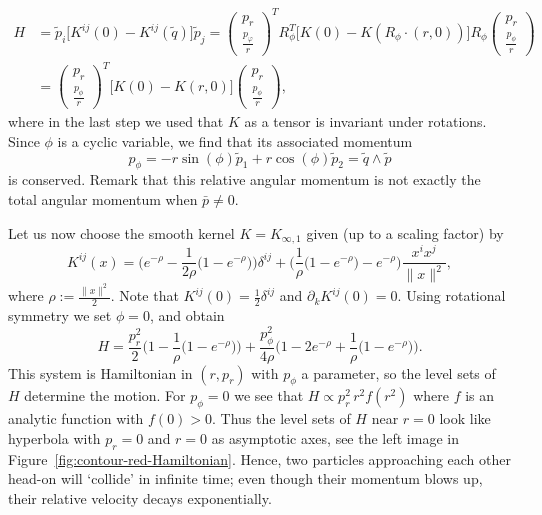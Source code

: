 \documentclass[12pt]{amsart}
\begin{document}
\begin{equation*}
  \begin{aligned}
  H &= \tilde{p}_i \big[ K^{ij}(0) - K^{ij}(\tilde{q}) \big] \tilde{p}_j
     = \begin{pmatrix} p_r \\ \frac{p_\varphi}{r} \end{pmatrix}^T R_\phi^T
       \big[ K(0) - K(R_\phi\cdot(r,0)) \big] R_\phi
       \begin{pmatrix} p_r \\ \frac{p_\phi}{r} \end{pmatrix}\\
    &= \begin{pmatrix} p_r \\ \frac{p_\phi}{r} \end{pmatrix}^T
       \big[ K(0) - K(r,0) \big] \begin{pmatrix} p_r \\ \frac{p_\phi}{r} \end{pmatrix},
  \end{aligned}
\end{equation*}
where in the last step we used that $K$ as a tensor is invariant under
rotations. Since $\phi$ is a cyclic variable, we find that its
associated momentum
\begin{equation*}
  p_\phi = -r \sin(\phi) \tilde{p}_1 + r \cos(\phi) \tilde{p}_2
            = \tilde{q} \wedge \tilde{p}
\end{equation*}
is conserved. Remark that this relative angular momentum is not
exactly the total angular momentum when $\bar{p} \neq 0$.

Let us now choose the smooth kernel $K = K_{\infty,1}$ given
(up to a scaling factor) by
%
{\newcommand{\e}{e^{-\rho}}
\begin{equation}\label{eq:smooth-kernel}
  K^{ij}(x) = \Big(\e - \frac{1}{2\rho}\big(1 - \e\big)\Big)\delta^{ij}
    + \Big(\frac{1}{\rho}\big(1 - \e\big) - \e\Big)\frac{x^i x^j}{\|x\|^2},
\end{equation}%
}%
where $\rho := \frac{\|x\|^2}{2}$. Note that
$K^{ij}(0) = \frac{1}{2} \delta^{ij}$ and $\partial_k K^{ij}(0) = 0$.
Using rotational symmetry we set $\phi = 0$, and obtain
\begin{equation}\label{eq:H-rot-reduced}
  H = \frac{p_r^2      }{2}    \Big(1 - \frac{1}{\rho}\big(1-e^{-\rho}\big)\Big)
     +\frac{p_\phi^2}{4\rho}\Big(1 - 2e^{-\rho} + \frac{1}{\rho}\big(1-e^{-\rho}\big)\Big).
\end{equation}
This system is Hamiltonian in $(r,p_r)$ with $p_\phi$ a parameter, so
the level sets of $H$ determine the motion. For $p_\phi = 0$ we see
that $H \propto p_r^2\, r^2 f(r^2)$ where $f$ is an analytic function
with $f(0) > 0$. Thus the level sets of $H$ near $r = 0$ look like
hyperbola with $p_r = 0$ and $r = 0$ as asymptotic axes, see the left image in
Figure~\eqref{fig:contour-red-Hamiltonian}. Hence, two particles approaching
each other head-on will `collide' in infinite time; even though their
momentum blows up, their relative velocity decays exponentially.
\end{document}
